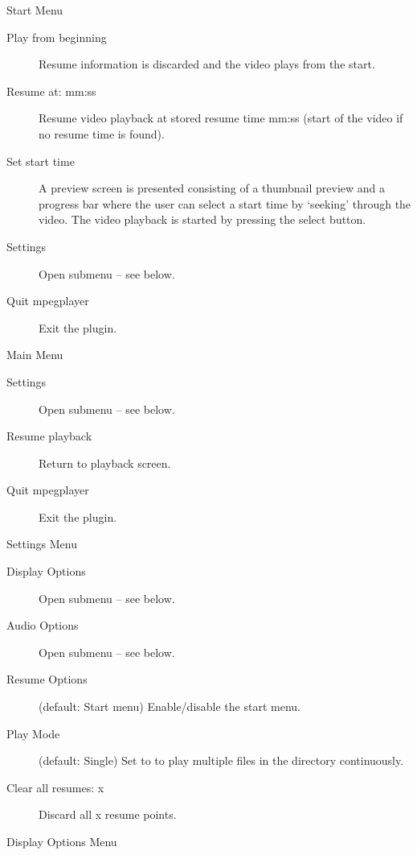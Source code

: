 Start Menu

\begin{description}
\item[Play from beginning] Resume information is discarded and the video plays
    from the start.
\item[Resume at: mm:ss] Resume video playback at stored resume time mm:ss
    (start of the video if no resume time is found).
\item[Set start time] A preview screen is presented consisting of a
    thumbnail preview and a progress bar where the user can select a start time
    by `seeking' through the video. The video playback is started by pressing
    the select button.
\item[Settings] Open  submenu -- see below.
\item[Quit mpegplayer] Exit the plugin.
\end{description}

Main Menu

\begin{description}
\item[Settings] Open  submenu -- see below.
\item[Resume playback] Return to playback screen.
\item[Quit mpegplayer] Exit the plugin.
\end{description}

Settings Menu

\begin{description}
\item[Display Options] Open  submenu -- see below.
\item[Audio Options] Open  submenu -- see below.
\item[Resume Options] (default: Start menu) Enable/disable the start menu.
\item[Play Mode] (default: Single) Set to  to play multiple
     files in the directory continuously.
\item[Clear all resumes: x] Discard all x resume points.
\end{description}

Display Options Menu

